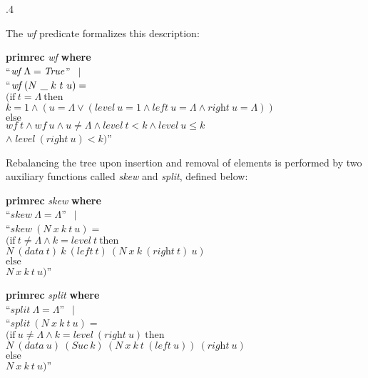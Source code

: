 \documentclass[a4paper,12pt]{article}
\renewcommand\_{\hbox{\textunderscore\kern-.05ex}}
\begin{document}
\kern.4\parskip %

The \textit{wf} predicate formalizes this description:

\prew
\textbf{primrec} \textit{wf} \textbf{where} \\
``$\textit{wf}~\Lambda = \textit{True\/}$'' $\,\mid$ \\
``$\textit{wf}~(N~\_~k~t~u) =$ \\
\phantom{``}$(\textrm{if}~t = \Lambda~\textrm{then}$ \\
\phantom{``$(\quad$}$k = 1 \mathrel{\land} (u = \Lambda \mathrel{\lor} (\textit{level}~u = 1 \mathrel{\land} \textit{left}~u = \Lambda \mathrel{\land} \textit{right}~u = \Lambda))$ \\
\phantom{``$($}$\textrm{else}$ \\
\hbox{}\phantom{``$(\quad$}$\textit{wf}~t \mathrel{\land} \textit{wf}~u
\mathrel{\land} u \not= \Lambda \mathrel{\land} \textit{level}~t < k
\mathrel{\land} \textit{level}~u \le k$ \\
\hbox{}\phantom{``$(\quad$}${\land}\; \textit{level}~(\textit{right}~u) < k)$''
\postw

Rebalancing the tree upon insertion and removal of elements is performed by two
auxiliary functions called \textit{skew} and \textit{split}, defined below:

\prew
\textbf{primrec} \textit{skew} \textbf{where} \\
``$\textit{skew}~\Lambda = \Lambda$'' $\,\mid$ \\
``$\textit{skew}~(N~x~k~t~u) = {}$ \\
\phantom{``}$(\textrm{if}~t \not= \Lambda \mathrel{\land} k =
\textit{level}~t~\textrm{then}$ \\
\phantom{``(\quad}$N~(\textit{data}~t)~k~(\textit{left}~t)~(N~x~k~
(\textit{right}~t)~u)$ \\
\phantom{``(}$\textrm{else}$ \\
\phantom{``(\quad}$N~x~k~t~u)$''
\postw

\prew
\textbf{primrec} \textit{split} \textbf{where} \\
``$\textit{split}~\Lambda = \Lambda$'' $\,\mid$ \\
``$\textit{split}~(N~x~k~t~u) = {}$ \\
\phantom{``}$(\textrm{if}~u \not= \Lambda \mathrel{\land} k =
\textit{level}~(\textit{right}~u)~\textrm{then}$ \\
\phantom{``(\quad}$N~(\textit{data}~u)~(\textit{Suc}~k)~
(N~x~k~t~(\textit{left}~u))~(\textit{right}~u)$ \\
\phantom{``(}$\textrm{else}$ \\
\phantom{``(\quad}$N~x~k~t~u)$''
\postw
\end{document}
